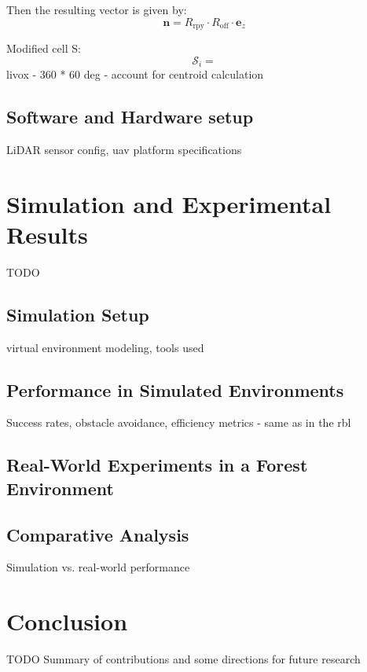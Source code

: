            Then the resulting vector is given by:  
            \[
            \mathbf{n} = R_{\text{rpy}} \cdot R_{\text{off}} \cdot \mathbf{e}_z
            \]

            Modified cell S:
            \begin{equation}
                \mathcal{S}_i = {} 
            \end{equation}
            livox - 360 * 60 deg - account for centroid calculation
        \subsection{Software and Hardware setup}
            LiDAR sensor config, uav platform specifications
    
    \section{Simulation and Experimental Results}
        TODO
        \subsection{Simulation Setup}
            virtual environment modeling, tools used
        \subsection{Performance in Simulated Environments}
            Success rates, obstacle avoidance, efficiency metrics - same as in the rbl
        \subsection{Real-World Experiments in a Forest Environment}
        \subsection{Comparative Analysis}
            Simulation vs. real-world performance
    
    \section{Conclusion}
        TODO
        Summary of contributions and some directions for future research
    






















